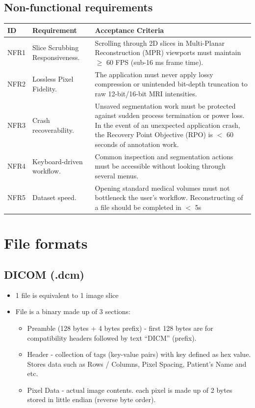 \documentclass[11pt, a4paper]{article}
\begin{document}
\subsection{Non-functional requirements}

\begin{tabularx}{\textwidth}{|l|X|X|}
\hline
ID  & Requirement                       & Acceptance Criteria \\ \hline
NFR1 & Slice Scrubbing Responsiveness.  & Scrolling through 2D slices in Multi-Planar Reconstruction (MPR) viewports must maintain $\geq$ 60 FPS (sub-16 ms frame time). \\ \hline
NFR2 & Lossless Pixel Fidelity.         & The application must never apply lossy compression or unintended bit-depth truncation to raw 12-bit/16-bit MRI intensities. \\ \hline
NFR3 & Crash recoverability.            & Unsaved segmentation work must be protected against sudden process termination or power loss. In the event of an unexpected application crash, the Recovery Point Objective (RPO) is $<$ 60 seconds of annotation work. \\ \hline
NFR4 & Keyboard-driven workflow.        & Common inspection and segmentation actions must be accessible without looking through several menus. \\ \hline
NFR5 & Dataset speed.                   & Opening standard medical volumes must not bottleneck the user's workflow. Reconstructing of a file should be completed in $<$ 5s \\ \hline
\end{tabularx}

\section{File formats}
\subsection{DICOM (.dcm)}
\begin{itemize}
    \item 1 file is equivalent to 1 image slice
    \item File is a binary made up of 3 sections:
    \begin{itemize}
        \item Preamble (128 bytes + 4 bytes prefix) - first 128 bytes are for compatibility headers followed by text “DICM” (prefix).
        \item Header - collection of tags (key-value pairs) with key defined as hex value. Stores data such as Rows / Columns, Pixel Spacing, Patient's Name and etc.
        \item Pixel Data - actual image contents. each pixel is made up of 2 bytes stored in little endian (reverse byte order).
    \end{itemize}
\end{itemize}
\end{document}
